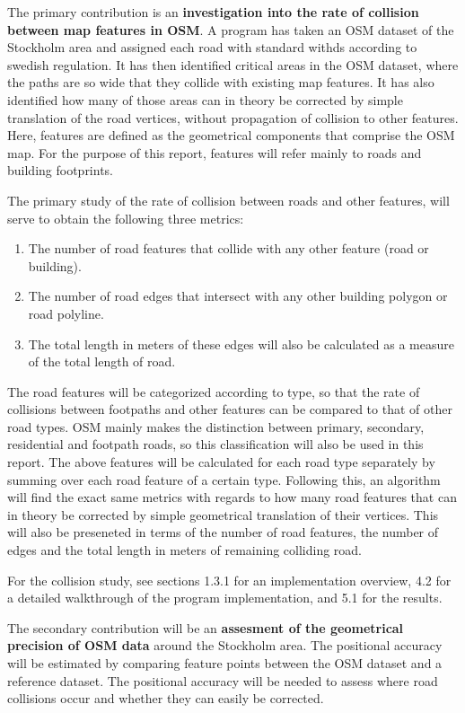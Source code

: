 \documentclass{kththesis}
\begin{document}
The primary contribution is an \textbf{investigation into the rate of collision between map features in OSM}.
A program has taken an OSM dataset of the Stockholm area and assigned each road with standard withds according to swedish regulation.
It has then identified critical areas in the OSM dataset, where the paths are so wide that they collide with existing map features.
It has also identified how many of those areas can in theory be corrected by simple translation of the road vertices, without propagation of collision to other features.
Here, features are defined as the geometrical components that comprise the OSM map.
For the purpose of this report, features will refer mainly to roads and building footprints.

The primary study of the rate of collision between roads and other features, will serve to obtain the following three metrics:

\begin{enumerate}
    \item The number of road features that collide with any other feature (road or building).
    \item The number of road edges that intersect with any other building polygon or road polyline.
    \item The total length in meters of these edges will also be calculated as a measure of the total length of road.
\end{enumerate}

The road features will be categorized according to type, so that the rate of collisions between footpaths and other features can be compared to that of other road types.
OSM mainly makes the distinction between primary, secondary, residential and footpath roads, so this classification will also be used in this report.
The above features will be calculated for each road type separately by summing over each road feature of a certain type.
Following this, an algorithm will find the exact same metrics with regards to how many road features that can in theory be corrected by simple geometrical translation of their vertices.
This will also be preseneted in terms of the number of road features, the number of edges and the total length in meters of remaining colliding road.

For the collision study, see sections 1.3.1 for an implementation overview, 4.2 for a detailed walkthrough of the program implementation, and 5.1 for the results.

The secondary contribution will be an \textbf{assesment of the geometrical precision of OSM data} around the Stockholm area.
The positional accuracy will be estimated by comparing feature points between the OSM dataset and a reference dataset.
The positional accuracy will be needed to assess where road collisions occur and whether they can easily be corrected.
\end{document}
